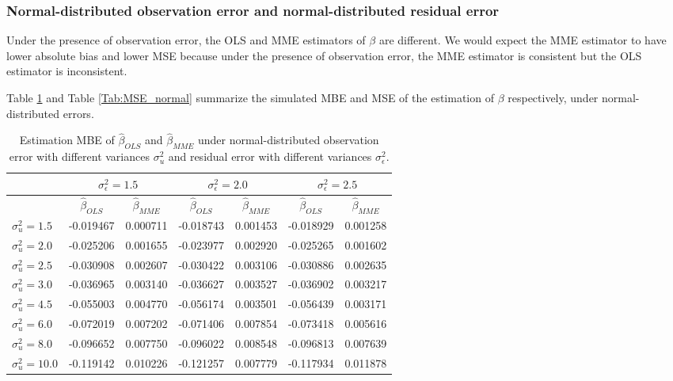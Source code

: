 \documentclass{article}
\begin{document}
\subsubsection{Normal-distributed observation error and normal-distributed residual error}

Under the presence of observation error, the OLS and MME estimators of $\beta$ are different.
We would expect the MME estimator to have lower absolute bias and lower MSE because under the presence of observation error, the MME estimator is consistent but the OLS estimator is inconsistent.

Table \ref{Tab:MBE_normal} and Table \ref{Tab:MSE_normal} summarize the simulated MBE and MSE of the estimation of $\beta$ respectively, under normal-distributed errors.

\begin{table}[ht]
    \centering
    \caption{Estimation MBE of $\hat{\beta}_{OLS}$ and $\hat{\beta}_{MME}$ under normal-distributed observation error with different variances $\sigma^2_u$ and residual error with different variances $\sigma^2_\epsilon$.}
    \label{Tab:MBE_normal}
    \begin{tabular}[t]{lcccccc}
        \hline
        &\multicolumn{2}{c}{$\sigma^2_\epsilon=1.5$}&\multicolumn{2}{c}{$\sigma^2_\epsilon=2.0$}&\multicolumn{2}{c}{$\sigma^2_\epsilon=2.5$}\\
        \hline
        &$\hat{\beta}_{OLS}$&$\hat{\beta}_{MME}$&$\hat{\beta}_{OLS}$&$\hat{\beta}_{MME}$&$\hat{\beta}_{OLS}$&$\hat{\beta}_{MME}$\\
        \hline
        $\sigma^2_u = 1.5$&-0.019467&0.000711&-0.018743&0.001453&-0.018929&0.001258\\
        $\sigma^2_u = 2.0$&-0.025206&0.001655&-0.023977&0.002920&-0.025265&0.001602\\
        $\sigma^2_u = 2.5$&-0.030908&0.002607&-0.030422&0.003106&-0.030886&0.002635\\
        $\sigma^2_u = 3.0$&-0.036965&0.003140&-0.036627&0.003527&-0.036902&0.003217\\
        $\sigma^2_u = 4.5$&-0.055003&0.004770&-0.056174&0.003501&-0.056439&0.003171\\
        $\sigma^2_u = 6.0$&-0.072019&0.007202&-0.071406&0.007854&-0.073418&0.005616\\
        $\sigma^2_u = 8.0$&-0.096652&0.007750&-0.096022&0.008548&-0.096813&0.007639\\
        $\sigma^2_u = 10.0$&-0.119142&0.010226&-0.121257&0.007779&-0.117934&0.011878\\
        \hline
    \end{tabular}
\end{table}
\end{document}
